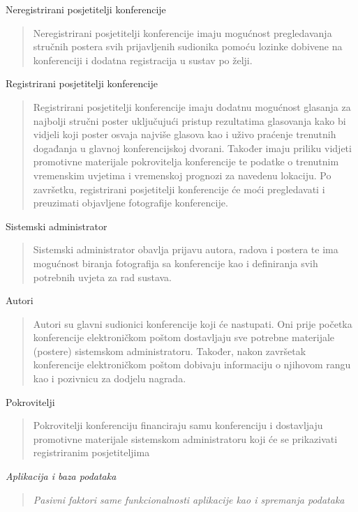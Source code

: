 			
			\begin{packed_enum}
				\item Neregistrirani posjetitelji konferencije
				
			\begin{quote}
				Neregistrirani posjetitelji konferencije imaju mogućnost pregledavanja stručnih postera svih prijavljenih sudionika pomoću lozinke dobivene na konferenciji i dodatna registracija u sustav po želji.
			\end{quote}
				
				\item Registrirani posjetitelji konferencije
				
		\begin{quote}
			Registrirani posjetitelji konferencije imaju dodatnu mogućnost glasanja za najbolji stručni poster uključujući pristup rezultatima glasovanja kako bi vidjeli koji poster osvaja najviše glasova kao i uživo praćenje trenutnih događanja u glavnoj konferencijskoj dvorani. Također imaju priliku vidjeti promotivne materijale pokrovitelja konferencije te podatke o trenutnim vremenskim uvjetima i vremenskoj prognozi za navedenu lokaciju. Po završetku, registrirani posjetitelji konferencije će moći pregledavati i preuzimati objavljene fotografije konferencije.
		\end{quote}
		
				\item Sistemski administrator
				\begin{quote}
					Sistemski administrator obavlja prijavu autora, radova i postera te ima mogućnost biranja fotografija sa konferencije kao i definiranja svih potrebnih uvjeta za rad sustava.
				\end{quote}
				
				\item Autori
				\begin{quote}
					Autori su glavni sudionici konferencije koji će nastupati. Oni prije početka konferencije elektroničkom poštom dostavljaju sve potrebne materijale (postere) sistemskom administratoru. Također, nakon završetak konferencije elektroničkom poštom dobivaju informaciju o njihovom rangu kao i pozivnicu za dodjelu nagrada.
				\end{quote}
				
				\item Pokrovitelji
				\begin{quote}
					Pokrovitelji konferenciju financiraju samu konferenciju i dostavljaju promotivne materijale sistemskom administratoru koji će se prikazivati registriranim posjetiteljima
				\end{quote}
				
				
				\item \textit{Aplikacija i baza podataka}
				\begin{quote}
					\textit{Pasivni faktori same funkcionalnosti aplikacije kao i spremanja podataka}
				\end{quote}
			\end{packed_enum}
			
